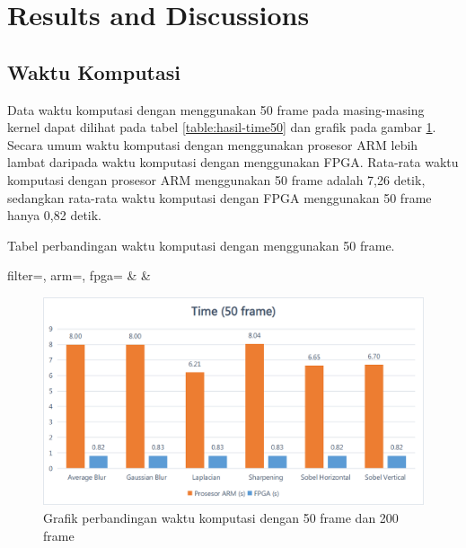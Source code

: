 
\section{Results and Discussions}

\subsection{Waktu Komputasi}

Data waktu komputasi dengan menggunakan 50 frame pada masing-masing kernel dapat dilihat pada tabel \ref{table:hasil-time50} dan grafik pada gambar \ref{fig:chart-time50}. Secara umum waktu komputasi dengan menggunakan prosesor ARM lebih lambat daripada waktu komputasi dengan menggunakan FPGA. Rata-rata waktu komputasi dengan prosesor ARM menggunakan 50 frame adalah 7,26 detik, sedangkan rata-rata waktu komputasi dengan FPGA menggunakan 50 frame hanya 0,82 detik.
\begin{atable}
    \caption{Tabel perbandingan waktu komputasi dengan menggunakan 50 frame.}
    \label{table:hasil-time50}
        {
            filter=\filter, 
            arm=\arm, 
            fpga=\fpga}
        {
            \filter & 
            \arm & 
            \fpga }
\end{atable}
\begin{figure}[ht]
    \centering
    \includegraphics[width=0.81\linewidth, center]{images/chart/chart-time50.png}
    \caption{Grafik perbandingan waktu komputasi dengan 50 frame dan 200 frame}
    \label{fig:chart-time50}
\end{figure}


